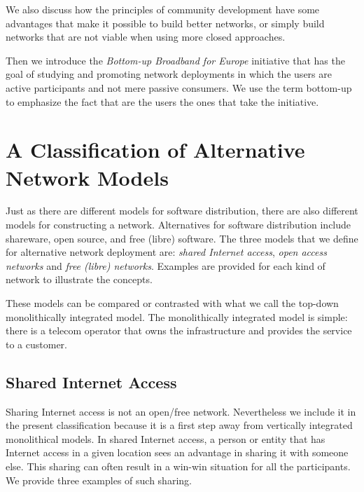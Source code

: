 \documentclass[journal]{IEEEtran}
\begin{document}
We also discuss how the principles of community development have some advantages that make it possible to build better networks, or simply build networks that are not viable when using more closed approaches.


Then we introduce the \emph{Bottom-up Broadband for Europe} initiative that has the goal of studying and promoting network deployments in which the users are active participants and not mere passive consumers.
We use the term bottom-up to emphasize the fact that are the users the ones that take the initiative.

\section{A Classification of Alternative Network Models}

Just as there are different models for software distribution, there are also different models for constructing a network.
Alternatives for software distribution include shareware, open source, and free (libre) software.
The three models that we define for alternative network deployment are: \emph{shared Internet access}, \emph{open access networks} and \emph{free (libre) networks}.
Examples are provided for each kind of network to illustrate the concepts.

These models can be compared or contrasted with what we call the top-down monolithically integrated model.
The monolithically integrated model is simple: there is a telecom operator that owns the infrastructure and provides the service to a customer.



\subsection{Shared Internet Access}

Sharing Internet access is not an open/free network.
Nevertheless we include it in the present classification because it is a first step away from vertically integrated monolithical models.
In shared Internet access, a person or entity that has Internet access in a given location sees an advantage in sharing it with someone else.
This sharing can often result in a win-win situation for all the participants.
We provide three examples of such sharing.
\end{document}
